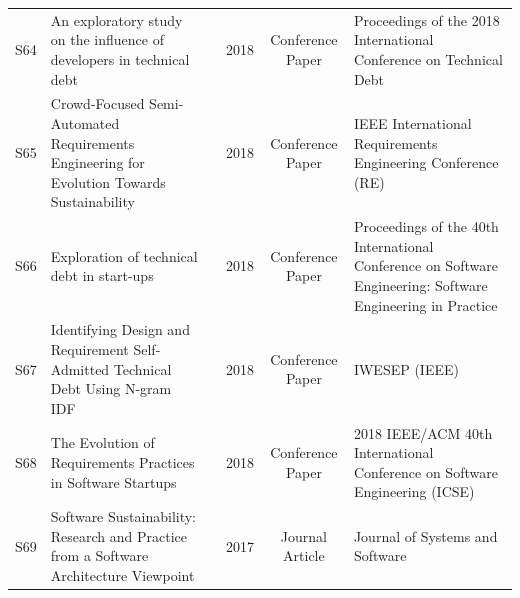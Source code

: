 \documentclass[12pt,reqno, twoside]{amsbook}
\theoremstyle{plain}
\numberwithin{equation}{chapter}
\numberwithin{section}{chapter}
\begin{document}
\begin{landscape}
\begin{center}
\begin{longtable}{|c|p{5cm}|p{4.5cm}|c|c|p{5.5cm}|}
S64 & An exploratory study on the influence of developers in technical debt & \citeauthor{Alfayez2018} & 2018 & Conference Paper & Proceedings of the 2018 International Conference on Technical Debt \\
S65 & Crowd-Focused Semi-Automated Requirements Engineering for Evolution Towards Sustainability & \citeauthor{Seyff2018} & 2018 & Conference Paper & IEEE International Requirements Engineering Conference (RE) \\
S66 & Exploration of technical debt in start-ups & \citeauthor{Klotins2018} & 2018 & Conference Paper & Proceedings of the 40th International Conference on Software Engineering: Software Engineering in Practice \\
S67 & Identifying Design and Requirement Self-Admitted Technical Debt Using N-gram {IDF} & \citeauthor{Wattanakriengkrai2018} & 2018 & Conference Paper & IWESEP (IEEE) \\
S68 & The Evolution of Requirements Practices in Software Startups & \citeauthor{Gralha2018} & 2018 & Conference Paper & 2018 IEEE/ACM 40th International Conference on Software Engineering (ICSE) \\

S69 & Software Sustainability: Research and Practice from a Software Architecture Viewpoint & \citeauthor{Venters2018} & 2017 & Journal Article & Journal of Systems and Software \\

\end{longtable}
\end{center}
\end{landscape}
\end{document}
